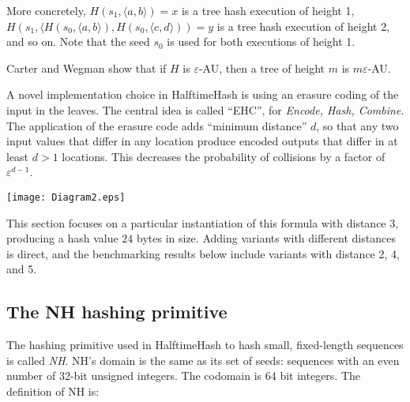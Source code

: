 \documentclass[sigconf, nonacm]{acmart}
\begin{document}
More concretely, $H(s_1,\langle{}a,b\rangle) = x$ is a tree hash execution of height 1, $H(s_1, \langle H(s_0, \langle a,b\rangle), H(s_0, \langle c,d\rangle)) = y$ is a tree hash execution of height 2, and so on.
Note that the seed $s_0$ is used for both executions of height 1.

Carter and Wegman show that if $H$ is $\varepsilon$-AU, then a tree of height $m$ is $m\varepsilon$-AU.

A novel implementation choice in HalftimeHash is using an erasure coding of the input in the leaves.
The central idea is called ``EHC'', for {\em Encode, Hash, Combine}. \cite{ehc-nandi}
The application of the erasure code adds ``minimum distance'' $d$, so that any two input values that differ in any location produce encoded outputs that differ in at least $d > 1$ locations.
This decreases the probability of collisions by a factor of $\varepsilon^{d-1}$.

\texttt{[image: Diagram2.eps]}

This section focuses on a particular instantiation of this formula with distance $3$, producing a hash value $24$ bytes in size.
Adding variants with different distances is direct, and the benchmarking results below include variants with distance 2, 4, and 5.

\subsection{The NH hashing primitive}

The hashing primitive used in HalftimeHash to hash small, fixed-length sequences is called {\em NH}. \cite{umac}
NH's domain is the same as its set of seeds: sequences with an even number of 32-bit unsigned integers.
The codomain is 64 bit integers.
The definition of NH is:
\end{document}
